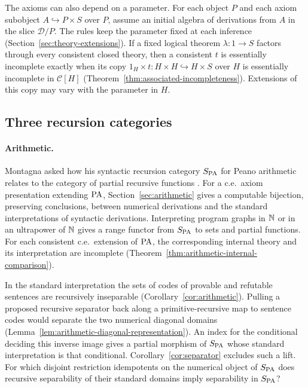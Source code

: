 The axioms can also depend on a parameter. For each object $P$ and each
axiom subobject $A\hookrightarrow P\times S$ over $P$, assume an initial
algebra of derivations from $A$ in the slice $\mathcal D/P$. The rules
keep the parameter fixed at each inference
(Section~\ref{sec:theory-extensions}). If a fixed logical theorem $\lambda:1\to S$ factors through
every consistent closed theory, then a consistent $t$ is essentially
incomplete exactly when its copy
$1_H\times t:H\times H\hookrightarrow H\times S$ over $H$ is
essentially incomplete in $\mathscr C[H]$
(Theorem~\ref{thm:associated-incompleteness}). Extensions of this copy
may vary with the parameter in $H$.

\subsection{Three recursion categories}

\paragraph{Arithmetic.}
Montagna asked how his syntactic recursion category $S_{\mathrm{PA}}$ for Peano
arithmetic relates to the category of partial recursive functions
\cite[pp.~114--115]{Montagna}. For a c.e.\ axiom presentation extending
$\mathrm{PA}$, Section~\ref{sec:arithmetic} gives a computable bijection,
preserving conclusions, between numerical derivations and the standard
interpretations of syntactic derivations. Interpreting program graphs
in $\mathbb N$ or in an ultrapower of $\mathbb N$ gives a range functor from
$S_{\mathrm{PA}}$ to sets and partial functions. For each consistent c.e.\
extension of $\mathrm{PA}$, the corresponding internal theory and its
interpretation are incomplete (Theorem~\ref{thm:arithmetic-internal-comparison}).

In the standard interpretation the sets of codes of provable and
refutable sentences are recursively inseparable (Corollary~\ref{cor:arithmetic}).
Pulling a proposed recursive separator back along a primitive-recursive
map to sentence codes would separate the two numerical diagonal domains
(Lemma~\ref{lem:arithmetic-diagonal-representation}). An index for the
conditional deciding this inverse image gives a partial morphism of
$S_{\mathrm{PA}}$ whose standard interpretation is that conditional. Corollary~\ref{cor:separator} excludes such a lift.
For which disjoint restriction idempotents on the numerical object of
$S_{\mathrm{PA}}$ does recursive
separability of their standard domains imply separability in $S_{\mathrm{PA}}$?

